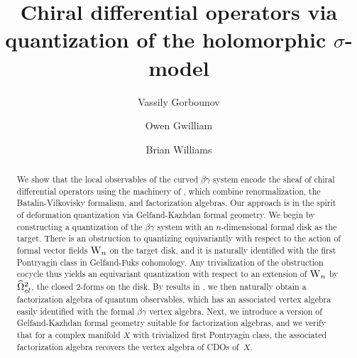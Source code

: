 \documentclass[10pt,oneside]{amsart}
\title{Chiral differential operators via\\quantization of the holomorphic $\sigma$-model}
\author{Vassily Gorbounov}
\author{Owen Gwilliam}
\author{Brian Williams}
\begin{document}
\maketitle

\begin{abstract}
We show that the local observables of the curved $\beta\gamma$ system
encode the sheaf of chiral differential operators using the machinery of \cite{CG1, CG2}, 
which combine renormalization, the Batalin-Vilkovisky formalism, and factorization algebras. 
Our approach is in the spirit of deformation quantization via Gelfand-Kazhdan formal geometry.
We begin by constructing a quantization of the $\beta\gamma$ system with an $n$-dimensional formal disk as the target. There is an obstruction to quantizing equivariantly with respect to the action of formal vector fields ${{\rm W}_n}$ on the target disk, and it is naturally identified with the first Pontryagin class in Gelfand-Fuks cohomology.
Any trivialization of the obstruction cocycle thus yields an equivariant quantization with respect to an extension of ${{\rm W}_n}$ by $\widehat{\Omega}^2_{cl}$, the closed 2-forms on the disk. By results in \cite{CG1}, we then naturally obtain a factorization algebra of quantum observables, which has an associated vertex algebra easily identified with the formal $\beta\gamma$ vertex algebra. Next, we introduce a version of Gelfand-Kazhdan formal geometry suitable for factorization algebras, and we verify that for a complex manifold $X$ with trivialized first Pontryagin class, the associated factorization algebra recovers the vertex algebra of CDOs of~$X$.\\
\end{abstract}


\tableofcontents







\end{document}

